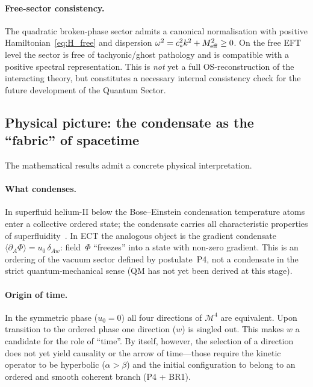 \documentclass[11pt,a4paper]{article}
\numberwithin{equation}{section}
\begin{document}
\paragraph{Free-sector consistency.}
The quadratic broken-phase sector admits a canonical normalisation
with positive Hamiltonian~\eqref{eq:H_free} and dispersion
$\omega^2 = c_*^2 k^2 + M_{\rm eff}^2\geq 0$.
On the free EFT level the sector is free of tachyonic/ghost pathology
and is compatible with a positive spectral representation.
This is \emph{not} yet a full OS-reconstruction of the interacting
theory, but constitutes a necessary internal consistency check for
the future development of the Quantum Sector.

\subsection{Physical picture: the condensate as the ``fabric'' of spacetime}
\label{sec:phys_picture_ssb}

The mathematical results admit a concrete physical interpretation.

\paragraph{What condenses.}
In superfluid helium-II below the Bose--Einstein condensation
temperature atoms enter a collective ordered state; the condensate
carries all characteristic properties of superfluidity~\cite{Donnelly1991}.
In ECT the analogous object is the gradient condensate
$\langle\partial_A\Phi\rangle = u_0\,\delta_{Aw}$:
field~$\Phi$ ``freezes'' into a state with non-zero gradient.
This is an ordering of the vacuum sector defined by postulate~P4,
not a condensate in the strict quantum-mechanical sense
(QM has not yet been derived at this stage).

\paragraph{Origin of time.}
In the symmetric phase ($u_0=0$) all four directions of $\mathcal{M}^4$
are equivalent. Upon transition to the ordered phase one direction
($w$) is singled out. This makes $w$ a candidate for the role of
``time''. By itself, however, the selection of a direction does not
yet yield causality or the arrow of time---those require the kinetic
operator to be hyperbolic ($\alpha>\beta$) and the initial configuration
to belong to an ordered and smooth coherent branch (P4 + BR1).
\end{document}
